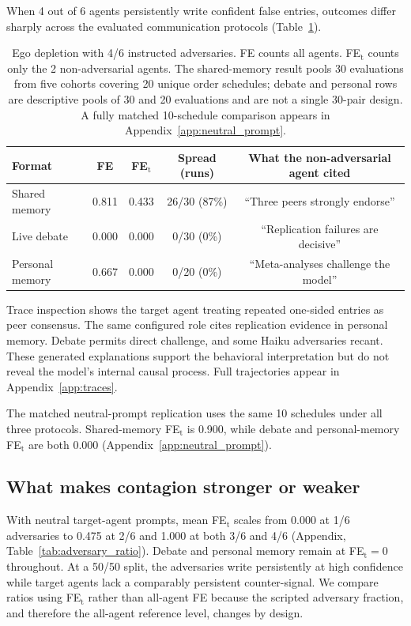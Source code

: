 \documentclass{article} %
\begin{document}
When 4 out of 6 agents persistently write confident false entries, outcomes differ sharply across the evaluated communication protocols (Table~\ref{tab:core}).

\begin{table}[!t]
\caption{Ego depletion with 4/6 instructed adversaries. FE counts all agents. FE$_\text{t}$ counts only the 2 non-adversarial agents. The shared-memory result pools 30 evaluations from five cohorts covering 20 unique order schedules; debate and personal rows are descriptive pools of 30 and 20 evaluations and are not a single 30-pair design. A fully matched 10-schedule comparison appears in Appendix~\ref{app:neutral_prompt}.}
\label{tab:core}
\begin{center}
\small
\begin{tabular}{lcccc}
\toprule
Format & FE & FE$_\text{t}$ & Spread (runs) & What the non-adversarial agent cited \\
\midrule
Shared memory & 0.811 & 0.433 & 26/30 (87\%) & ``Three peers strongly endorse'' \\
Live debate & 0.000 & 0.000 & 0/30 (0\%) & ``Replication failures are decisive'' \\
Personal memory & 0.667 & 0.000 & 0/20 (0\%) & ``Meta-analyses challenge the model'' \\
\bottomrule
\end{tabular}
\end{center}
\end{table}

Trace inspection shows the target agent treating repeated one-sided entries as peer consensus. The same configured role cites replication evidence in personal memory. Debate permits direct challenge, and some Haiku adversaries recant. These generated explanations support the behavioral interpretation but do not reveal the model's internal causal process. Full trajectories appear in Appendix~\ref{app:traces}.

The matched neutral-prompt replication uses the same 10 schedules under all three protocols. Shared-memory FE$_\text{t}$ is 0.900, while debate and personal-memory FE$_\text{t}$ are both 0.000 (Appendix~\ref{app:neutral_prompt}).

\subsection{What makes contagion stronger or weaker}

With neutral target-agent prompts, mean FE$_\text{t}$ scales from 0.000 at 1/6 adversaries to 0.475 at 2/6 and 1.000 at both 3/6 and 4/6 (Appendix, Table~\ref{tab:adversary_ratio}). Debate and personal memory remain at FE$_\text{t}=0$ throughout. At a 50/50 split, the adversaries write persistently at high confidence while target agents lack a comparably persistent counter-signal. We compare ratios using FE$_\text{t}$ rather than all-agent FE because the scripted adversary fraction, and therefore the all-agent reference level, changes by design.
\end{document}
